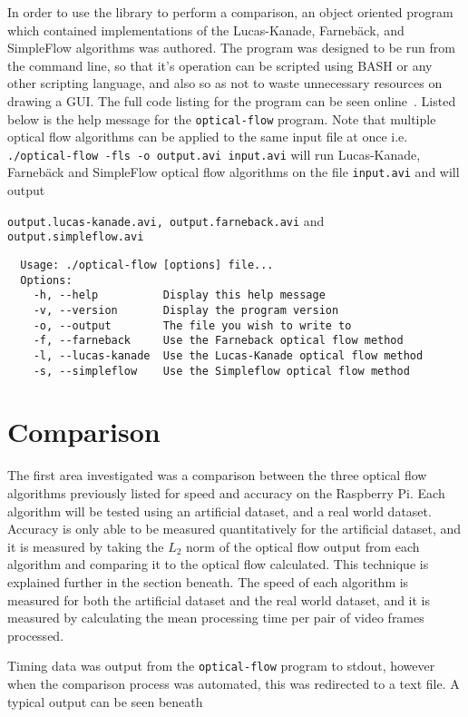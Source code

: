 In order to use the library to perform a comparison, an object oriented program which contained implementations of the Lucas-Kanade, Farnebäck, and SimpleFlow algorithms was authored. The program was designed to be run from the command line, so that it's operation can be scripted using BASH or any other scripting language, and also so as not to waste unnecessary resources on drawing a GUI. The full code listing for the program can be seen online~\cite{github}. Listed below is the help message for the \verb|optical-flow| program. Note that multiple optical flow algorithms can be applied to the same input file at once i.e. \verb|./optical-flow -fls -o output.avi input.avi| will run Lucas-Kanade, Farnebäck and SimpleFlow optical flow algorithms on the file \verb|input.avi| and will output 

\verb|output.lucas-kanade.avi, output.farneback.avi| and \verb|output.simpleflow.avi|
 
\singlespacing
\begin{verbatim}
  Usage: ./optical-flow [options] file...
  Options:
    -h, --help          Display this help message
    -v, --version       Display the program version
    -o, --output        The file you wish to write to
    -f, --farneback     Use the Farneback optical flow method
    -l, --lucas-kanade  Use the Lucas-Kanade optical flow method
    -s, --simpleflow    Use the Simpleflow optical flow method
\end{verbatim}
\onehalfspacing

\section{Comparison}

The first area investigated was a comparison between the three optical flow algorithms previously listed for speed and accuracy on the Raspberry Pi. Each algorithm will be tested using an artificial dataset, and a real world dataset. Accuracy is only able to be measured quantitatively for the artificial dataset, and it is measured by taking the $L_2$ norm of the optical flow output from each algorithm and comparing it to the optical flow calculated. This technique is explained further in the section beneath. The speed of each algorithm is measured for both the artificial dataset and the real world dataset, and it is measured by calculating the mean processing time per pair of video frames processed. 

Timing data was output from the \verb|optical-flow| program to stdout, however when the comparison process was automated, this was redirected to a text file. A typical output can be seen beneath

